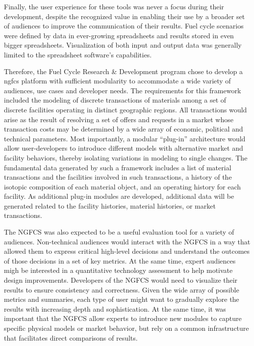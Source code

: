 Finally, the user experience for these tools was never a focus during their
development, despite the recognized value in enabling their use by a broader
set of audiences to improve the communication of their results.  Fuel cycle
scenarios were defined by data in ever-growing spreadsheets and results stored
in even bigger spreadsheets.  Visualization of both input and output data was
generally limited to the spreadsheet software's capabilities.

Therefore, the Fuel Cycle Research & Development program chose to develop a
\gls{ngfcs} platform with sufficient modularity to accommodate a wide variety
of audiences, use cases and developer needs. The requirements for this
framework included the modeling of discrete transactions of materials among a
set of discrete facilities operating in distinct geographic regions. All
transactions would arise as the result of resolving a set of offers and
requests in a market whose transaction costs may be determined by a wide array
of economic, political and technical parameters. Most importantly, a modular
“plug-in” architecture would allow user-developers to introduce different
models with alternative market and facility behaviors, thereby isolating
variations in modeling to single changes. The fundamental data generated by
such a framework includes a list of material transactions and the facilities
involved in such transactions, a history of the isotopic composition of each
material object, and an operating history for each facility. As additional
plug-in modules are developed, additional data will be generated related to
the facility histories, material histories, or market transactions.

The NGFCS was also expected to be a useful evaluation tool for a variety of
audiences.  Non-technical audiences would interact with the NGFCS in a way
that allowed them to express critical high-level decisions and understand the
outcomes of those decisions in a set of key metrics. At the same time, expert
audiences migh be interested in a quantitative technology assessment to help
motivate design improvements. Developers of the NGFCS would need to visualize
their results to ensure consistency and correctness. Given the wide array of
possible metrics and summaries, each type of user might want to gradually
explore the results with increasing depth and sophistication. At the same
time, it was important that the NGFCS allow experts to introduce new modules
to capture specific physical models or market behavior, but rely on a common
infrastructure that facilitates direct comparisons of results.

